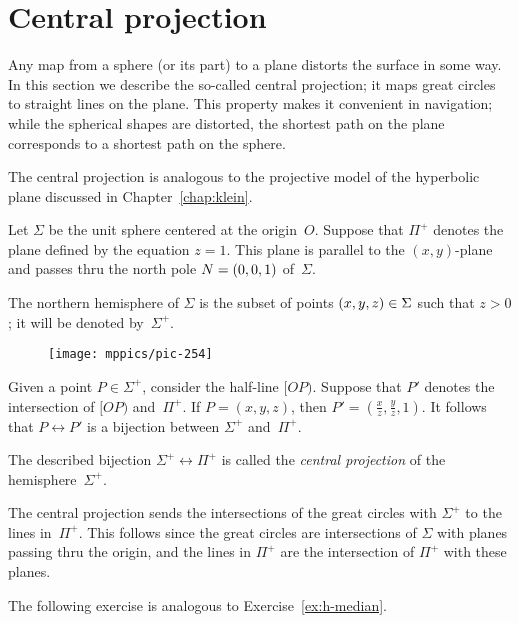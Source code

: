 \section{Central projection}

Any map from a sphere (or its part) to a plane distorts the surface in some way.
In this section we describe the so-called central projection; it maps great circles to straight lines on the plane.
This property makes it convenient in navigation;
while the spherical shapes are distorted, the shortest path on the plane corresponds to a shortest path on the sphere.

The central projection is analogous to the projective model of the hyperbolic plane discussed in Chapter~\ref{chap:klein}.

Let $\Sigma$ be the unit sphere centered at the origin~$O$.
Suppose that $\Pi^+$ denotes the plane defined by the equation $z=1$.
This plane is parallel to the $(x,y)$-plane and passes thru 
the north pole $N=(0,0,1)$ of~$\Sigma$.

The northern hemisphere of $\Sigma$
is the subset of points $(x,y,z)\in \Sigma$ such that $z>0$; it will be denoted by~$\Sigma^+$.

\begin{wrapfigure}{o}{40mm}
\centering
\vskip-3mm
\texttt{[image: mppics/pic-254]}
\end{wrapfigure}

Given a point $P\in \Sigma^+$, consider the half-line $[OP)$. 
Suppose that $P'$ denotes the intersection of $[OP)$ and~$\Pi^+$.
If $P=(x,y,z)$, then $P'=(\tfrac xz,\tfrac yz,1)$.
It follows that $P\leftrightarrow P'$ is a bijection between $\Sigma^+$ and~$\Pi^+$.



The described bijection $\Sigma^+\leftrightarrow \Pi^+$ is called the \emph{central projection} of 
the hemisphere~$\Sigma^+$.

The central projection sends the intersections of the great circles with $\Sigma^+$ to the lines in~$\Pi^+$.
This follows since the great circles are intersections of $\Sigma$ with planes passing thru the origin,
and the lines in $\Pi^+$ are the intersection of $\Pi^+$ with these planes.

The following exercise 
is analogous to Exercise~\ref{ex:h-median}.

